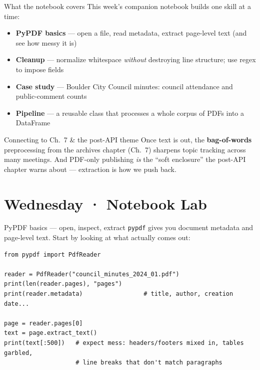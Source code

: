 \documentclass[9pt,aspectratio=169]{beamer}
\begin{document}
\begin{frame}{What the notebook covers}
    This week's companion notebook builds one skill at a time:
    \begin{itemize}
        \item \textbf{PyPDF basics} --- open a file, read metadata, extract page-level text (and see how messy it is)
        \item \textbf{Cleanup} --- normalize whitespace \textit{without} destroying line structure; use regex to impose fields
        \item \textbf{Case study} --- Boulder City Council minutes: council attendance and public-comment counts
        \item \textbf{Pipeline} --- a reusable class that processes a whole corpus of PDFs into a DataFrame
    \end{itemize}

    \vspace{0.75em}

    \begin{alertblock}{Connecting to Ch.~7 \& the post-API theme}
        \footnotesize Once text is out, the \textbf{bag-of-words} preprocessing from the archives chapter (Ch.~7) sharpens topic tracking across many meetings. And PDF-only publishing \textit{is} the ``soft enclosure'' the post-API chapter warns about --- extraction is how we push back.
    \end{alertblock}
\end{frame}

\section{Wednesday · Notebook Lab}

\begin{frame}[fragile]{PyPDF basics --- open, inspect, extract}
    \texttt{pypdf} gives you document metadata and page-level text. Start by looking at what actually comes out:
\begin{lstlisting}
from pypdf import PdfReader

reader = PdfReader("council_minutes_2024_01.pdf")
print(len(reader.pages), "pages")
print(reader.metadata)                 # title, author, creation date...

page = reader.pages[0]
text = page.extract_text()
print(text[:500])   # expect mess: headers/footers mixed in, tables garbled,
                    # line breaks that don't match paragraphs
\end{lstlisting}
\end{frame}
\end{document}
